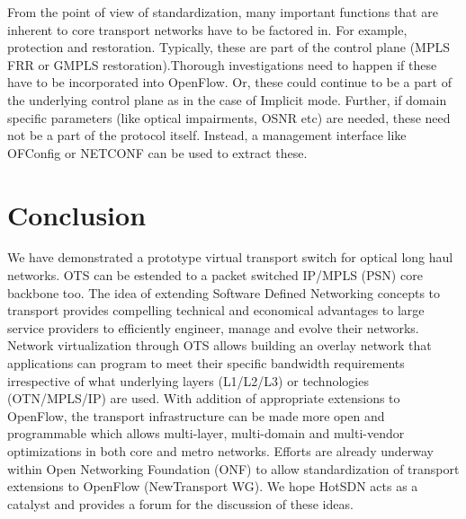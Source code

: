 \documentclass{sig-alternate-10pt}
\begin{document}
	From the point of view of standardization, many important functions that are inherent to core transport networks
	have to be factored in. For example, protection and restoration. Typically, these are part of the
	control plane (MPLS FRR or GMPLS restoration).Thorough investigations need to happen if
	these have to be incorporated into OpenFlow. Or, these could continue to be a part of the underlying control
	plane as in the case of Implicit mode. Further, if domain specific parameters (like optical impairments, OSNR etc)
	are needed, these need not be a part of the protocol itself. Instead, a management interface like OFConfig or
	NETCONF can be used to extract these.

\section{Conclusion}
	We have demonstrated a prototype virtual transport switch for optical long haul networks. OTS can be
	estended to a packet switched IP/MPLS (PSN) core backbone too. The idea of extending Software Defined
	Networking concepts to transport provides compelling technical and economical advantages to large service
	providers to efficiently engineer, manage and evolve their networks. Network virtualization through OTS
	allows building an overlay network that applications can program to meet their specific bandwidth
	requirements irrespective of what underlying layers (L1/L2/L3) or technologies (OTN/MPLS/IP) are used.
	With addition of appropriate extensions to OpenFlow, the transport infrastructure can be made more open
	and programmable which allows multi-layer, multi-domain and multi-vendor optimizations in both core and
	metro networks. Efforts are already underway within Open Networking Foundation (ONF) to allow
	standardization of transport extensions to OpenFlow (NewTransport WG). We hope HotSDN acts as
	a catalyst and provides a forum for the discussion of these ideas.


 
\end{document}
